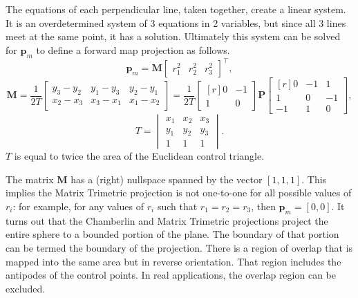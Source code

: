 \documentclass[]{interact}
\begin{document}
The equations of each perpendicular line, taken together, create a linear
system. It is an overdetermined system of 3 equations in 2 variables, but since
all 3 lines meet at the same point, it has a solution. Ultimately this system
can be solved for $\mathbf p_m$ to define a forward map projection as follows.
\begin{equation}\label{eq:forward}
\mathbf p_m = \mathbf M \begin{bmatrix*} r^2_1 & r^2_2 & r^2_3 \end{bmatrix*}^\top,
\end{equation}
\begin{equation}\label{eq:forwardm}
\mathbf M = \frac{1}{2T}
\begin{bmatrix*} y_3 - y_2 & y_1 - y_3 & y_2 - y_1 \\
x_2 - x_3 & x_3 - x_1 & x_1 - x_2 \end{bmatrix*} = \frac{1}{2T}
\begin{bmatrix*}[r] 0 & -1  \\
1 & 0 \end{bmatrix*}
\mathbf P
\begin{bmatrix*}[r] 0 & -1 & 1 \\
1 & 0 & -1 \\
-1 & 1 & 0 \end{bmatrix*},
\end{equation}
\begin{equation}\label{eq:forwardt}
T = \begin{vmatrix*} x_1 & x_2 & x_3 \\
 y_1 & y_2 & y_3 \\
 1 & 1 & 1
\end{vmatrix*}.
\end{equation}
$T$ is equal to twice the area of the Euclidean control triangle.

The matrix $\mathbf M$ has a (right) nullspace spanned by the vector
$[1, 1, 1]$. This implies the Matrix Trimetric projection is not one-to-one for
all possible values of $r_i$: for example, for any values of $r_i$ such that
$r_1 = r_2 = r_3$, then $\mathbf p_m = [0, 0]$. It turns out that the
Chamberlin and Matrix Trimetric projections project the entire sphere to a
bounded portion of the plane. The boundary of that portion can be termed the
boundary of the projection. There is a region of overlap that is mapped into
the same area but in reverse orientation. That region includes the antipodes of
the control points. In real applications, the overlap region can be excluded.
\end{document}
